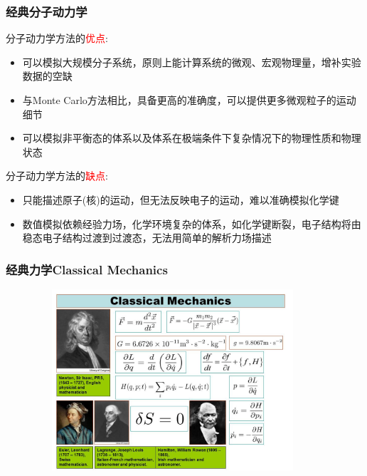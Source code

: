 \frame
{
	\frametitle{经典分子动力学}
	分子动力学方法的\textcolor{red}{优点}:
	\begin{itemize}
			\setlength{\itemsep}{5pt}
		\item 可以模拟大规模分子系统，原则上能计算系统的微观、宏观物理量，增补实验数据的空缺
		\item 与\textrm{Monte Carlo}方法相比，具备更高的准确度，可以提供更多微观粒子的运动细节
		\item 可以模拟非平衡态的体系以及体系在极端条件下复杂情况下的物理性质和物理状态
	\end{itemize}
	分子动力学方法的\textcolor{red}{缺点}:
	\begin{itemize}
			\setlength{\itemsep}{5pt}
		\item 只能描述原子(核)的运动，但无法反映电子的运动，难以准确模拟化学键
		\item 数值模拟依赖经验力场，化学环境复杂的体系，如化学键断裂，电子结构将由稳态电子结构过渡到过渡态，无法用简单的解析力场描述
	\end{itemize}
}

\frame
{
	\frametitle{经典力学\textrm{Classical Mechanics}}
\begin{figure}[h!]
\vspace*{-0.18in}
\centering
\includegraphics[height=2.65in,width=4.05in,viewport=0 0 715 495,clip]{Figures/Classical_Mechanics.jpg}
\label{Classical_Mechanics}
\end{figure}
}

